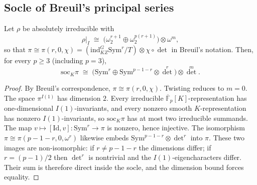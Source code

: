 \subsection{Socle of Breuil's principal series}
\begin{theorem}\label{thm:breuil-soc}
Let $\rho$ be absolutely irreducible with
\[
\rho\big|_I \;\cong\; \bigl(\omega_2^{r+1}\oplus\omega_2^{p(r+1)}\bigr)\otimes\omega^m,
\]
so that $\pi\cong\pi(r,0,\chi)=(\mathrm{ind}_{KZ}^G\mathrm{Sym}^r/T)\otimes\chi\circ\det$ in Breuil's notation. Then, for every $p\ge3$ (including $p=3$),
\[
\mathrm{soc}_K\pi \;\cong\; \bigl(\mathrm{Sym}^r \oplus \mathrm{Sym}^{p-1-r}\otimes\det^r\bigr)\otimes\det^m.
\]
\end{theorem}
\begin{proof}
By Breuil's correspondence, $\pi\cong\pi(r,0,\chi)$. Twisting reduces to $m=0$. The space $\pi^{I(1)}$ has dimension $2$. Every irreducible $\overline{\mathbb{F}}_p[K]$-representation has one-dimensional $I(1)$-invariants, and every nonzero smooth $K$-representation has nonzero $I(1)$-invariants, so $\mathrm{soc}_K\pi$ has at most two irreducible summands. The map $v\mapsto[\mathrm{Id},v]\colon\mathrm{Sym}^r\to\pi$ is nonzero, hence injective. The isomorphism $\pi\cong\pi(p-1-r,0,\omega^r)$ likewise embeds $\mathrm{Sym}^{p-1-r}\otimes\det^r$ into $\pi$. These two images are non-isomorphic: if $r\neq p-1-r$ the dimensions differ; if $r=(p-1)/2$ then $\det^r$ is nontrivial and the $I(1)$-eigencharacters differ. Their sum is therefore direct inside the socle, and the dimension bound forces equality.
\end{proof}

